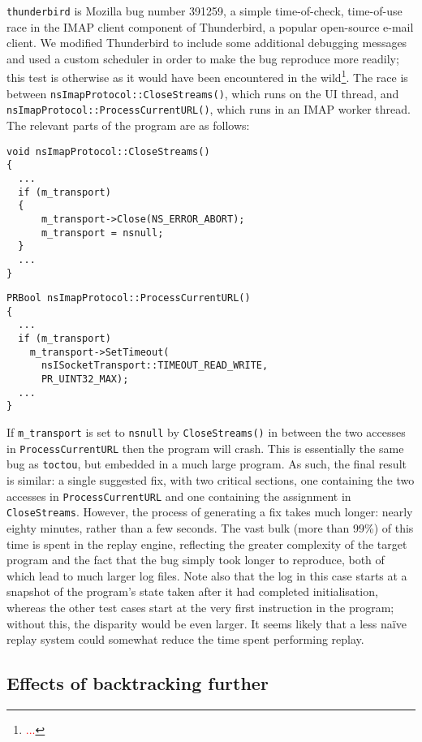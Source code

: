 \documentclass[10pt,twocolumn,preprint,natbib,authoryear]{sigplanconf}
\newcommand{\editorial}[1]{\textcolor{red}{\footnote{\textcolor{red}{#1}}}}
\begin{document}
\verb|thunderbird| is Mozilla bug number
391259\cite{thunderbird39125}, a simple time-of-check, time-of-use
race in the IMAP client component of Thunderbird, a popular
open-source e-mail client.  We modified Thunderbird to include some
additional debugging messages and used a custom scheduler in order to
make the bug reproduce more readily; this test is otherwise as it
would have been encountered in the wild\editorial{...}.  The race is
between \verb|nsImapProtocol::CloseStreams()|, which runs on the UI
thread, and \verb|nsImapProtocol::ProcessCurrentURL()|, which runs in
an IMAP worker thread.  The relevant parts of the program are as
follows:

\begin{verbatim}
void nsImapProtocol::CloseStreams()
{
  ...
  if (m_transport)
  {
      m_transport->Close(NS_ERROR_ABORT);
      m_transport = nsnull;
  }
  ...
}
\end{verbatim}

\begin{verbatim}
PRBool nsImapProtocol::ProcessCurrentURL()
{
  ...
  if (m_transport)
    m_transport->SetTimeout(
      nsISocketTransport::TIMEOUT_READ_WRITE,
      PR_UINT32_MAX);
  ...
}
\end{verbatim}

If \verb|m_transport| is set to \verb|nsnull| by \verb|CloseStreams()|
in between the two accesses in \verb|ProcessCurrentURL| then the
program will crash.  This is essentially the same bug as
\verb|toctou|, but embedded in a much large program.  As such, the
final result is similar: a single suggested fix, with two critical
sections, one containing the two accesses in \verb|ProcessCurrentURL|
and one containing the assignment in \verb|CloseStreams|.  However,
the process of generating a fix takes much longer: nearly eighty
minutes, rather than a few seconds.  The vast bulk (more than 99\%) of
this time is spent in the replay engine, reflecting the greater
complexity of the target program and the fact that the bug simply took
longer to reproduce, both of which lead to much larger log files.
Note also that the log in this case starts at a snapshot of the
program's state taken after it had completed initialisation, whereas
the other test cases start at the very first instruction in the
program; without this, the disparity would be even larger.  It seems
likely that a less na\"ive replay system could somewhat reduce the
time spent performing replay.

\subsection{Effects of backtracking further}
\label{sect:eval:backtrack}
\end{document}
